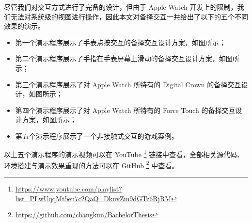 尽管我们对交互方式进行了完备的设计，但由于 Apple Watch 开发上的限制，我们无法对系统级的视图进行操作，因此本文对备择交互一共给出了以下的五个不同效果的演示。

\begin{itemize}
    \kaishu
    \item 第一个演示程序展示了手表点按交互的备择交互设计方案，如图所示；
    \item 第二个演示程序展示了手指在手表屏幕上滑动的备择交互设计方案，如图所示；
    \item 第三个演示程序展示了对 Apple Watch 所特有的 Digital Crown 的备择交互设计，如图所示；
    \item 第四个演示程序展示了对 Apple Watch 所特有的 Force Touch 的备择交互设计方案，如图所示；
    \item 第五个演示程序展示了一个非接触式交互的游戏案例。
\end{itemize}

以上五个演示程序的演示视频可以在 YouTube
\footnote{\url{https://www.youtube.com/playlist?list=PLwUqqMt5en7c2QaQ_DkuvZm9dGTz6RjRM}}
链接中查看，全部相关源代码、环境搭建与演示效果重现的方法可以在 GitHub
\footnote{\url{https://github.com/changkun/BachelorThesis}} 中查看。
